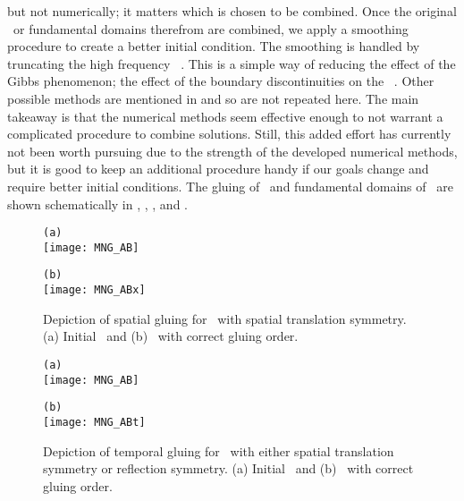 but not numerically; it matters which is chosen to be combined.
Once the original \twots\ or fundamental domains therefrom are combined,
we apply a smoothing procedure to create a better initial condition.
The smoothing is handled by truncating the high frequency \spt\ \Fcs.
This is a simple way
of reducing the effect of the Gibbs phenomenon; the effect of the boundary
discontinuities on the \spt\ \Fcs. Other possible methods are
mentioned in  and so are not repeated here. The main
takeaway is that the numerical methods seem effective enough to not
warrant a complicated procedure to combine solutions.
Still, this added effort has currently not been worth
pursuing due to the strength of the developed numerical methods, but
it is good to keep an additional procedure handy if our goals
change and require better initial conditions.
The gluing of \twots\ and fundamental domains of \twots\ are shown
schematically in , ,
,  and .


\begin{figure}
\begin{minipage}[height=.1\textheight]{.45\textwidth}
\centering
\small{\texttt{(a)}} \\
\texttt{[image: MNG\_AB]}
\end{minipage}
\begin{minipage}[height=.1\textheight]{.45\textwidth}
\centering
\small{\texttt{(b)}} \\
\texttt{[image: MNG\_ABx]}
\end{minipage}
\caption{ \label{fig:MNGspaceglue}
Depiction of spatial gluing for \twots\ with spatial translation symmetry.
(a) Initial \twots\ and (b) \twots\ with correct gluing order.
}
\end{figure}


\begin{figure}
\begin{minipage}[height=.1\textheight]{.45\textwidth}
\centering
\small{\texttt{(a)}} \\
\texttt{[image: MNG\_AB]}
\end{minipage}
\begin{minipage}[height=.1\textheight]{.45\textwidth}
\centering
\small{\texttt{(b)}} \\
\texttt{[image: MNG\_ABt]}
\end{minipage}
\caption{ \label{fig:MNGtimeglue}
Depiction of temporal gluing for \twots\ with either spatial translation symmetry
or reflection symmetry. (a) Initial
\twots\ and (b) \twots\ with correct gluing order.
}
\end{figure}


